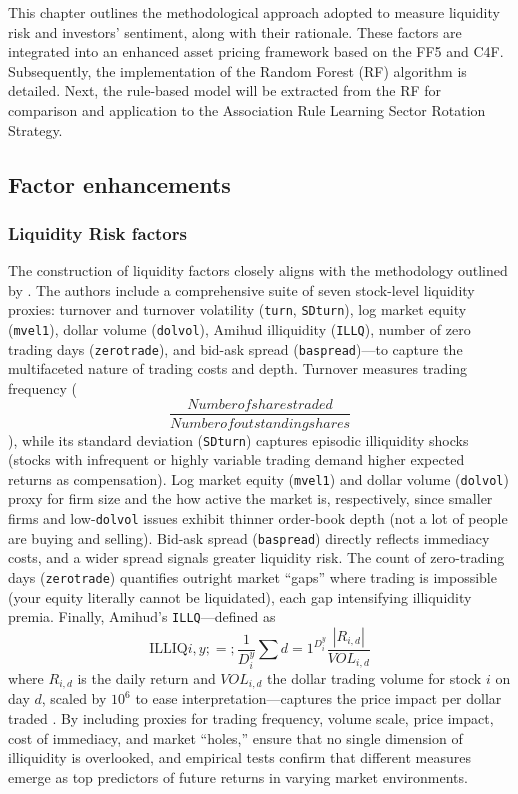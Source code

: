 This chapter outlines the methodological approach adopted to measure liquidity risk and investors' sentiment, along with their rationale. These factors are integrated into an enhanced asset pricing framework based on the FF5 and C4F. Subsequently, the implementation of the Random Forest (RF) algorithm is detailed. Next, the rule-based model will be extracted from the RF for comparison and application to the Association Rule Learning Sector Rotation Strategy.


\subsection{Factor enhancements}
\subsubsection{Liquidity Risk factors}
The construction of liquidity factors closely aligns with the methodology outlined by . The authors include a comprehensive suite of seven stock-level liquidity proxies: turnover and turnover volatility (\texttt{turn}, \texttt{SDturn}), log market equity (\texttt{mvel1}), dollar volume (\texttt{dolvol}), Amihud illiquidity (\texttt{ILLQ}), number of zero trading days (\texttt{zerotrade}), and bid-ask spread (\texttt{baspread})—to capture the multifaceted nature of trading costs and depth. Turnover measures trading frequency (\[\frac{Number of shares traded}{Number of outstanding shares}\]), while its standard deviation (\texttt{SDturn}) captures episodic illiquidity shocks (stocks with infrequent or highly variable trading demand higher expected returns as compensation). Log market equity (\texttt{mvel1}) and dollar volume (\texttt{dolvol}) proxy for firm size and the how active the market is, respectively, since smaller firms and low-\texttt{dolvol} issues exhibit thinner order-book depth (not a lot of people are buying and selling). Bid-ask spread (\texttt{baspread}) directly reflects immediacy costs, and a wider spread signals greater liquidity risk. The count of zero-trading days (\texttt{zerotrade}) quantifies outright market “gaps” where trading is impossible (your equity literally cannot be liquidated), each gap intensifying illiquidity premia. Finally, Amihud's \texttt{ILLQ}—defined as
\begin{equation}
\label{eq:amihud}
\text{ILLIQ}{i,y} ;=;\frac{1}{D_i^y}\sum{d=1}^{D_i^y}\frac{|R_{i,d}|}{VOL_{i,d}}
\end{equation}
where $R_{i,d}$ is the daily return and $VOL_{i,d}$ the dollar trading volume for stock $i$ on day $d$, scaled by $10^6$ to ease interpretation—captures the price impact per dollar traded . By including proxies for trading frequency, volume scale, price impact, cost of immediacy, and market “holes,”  ensure that no single dimension of illiquidity is overlooked, and empirical tests confirm that different measures emerge as top predictors of future returns in varying market environments.



